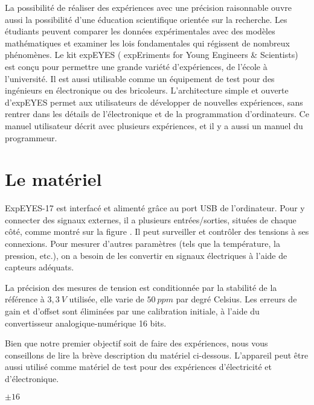 \documentclass[a4paper,12pt,french]{sphinxmanual}
\begin{document}
La possibilité de réaliser des expériences avec une précision raisonnable
ouvre aussi la possibilité d’une éducation scientifique orientée sur
la recherche. Les étudiants peuvent comparer les données expérimentales
avec des modèles mathématiques et examiner les lois fondamentales
qui régissent de nombreux phénomènes. Le kit expEYES ( expEriments
for Young Engineers \& Scientists) est conçu pour permettre une grande
variété d’expériences, de l’école à l’université. Il est aussi utilisable
comme un équipement de test pour des ingénieurs en électronique ou
des bricoleurs. L’architecture simple et ouverte d’expEYES permet
aux utilisateurs de développer de nouvelles expériences, sans rentrer
dans les détails de l’électronique et de la programmation d’ordinateurs.
Ce manuel utilisateur décrit  avec plusieurs expériences,
et il y a aussi un manuel du programmeur.


\chapter{Le matériel}
\label{\detokenize{1.2:le-materiel}}\label{\detokenize{1.2::doc}}
ExpEYES-17 est interfacé et alimenté grâce au port USB de l’ordinateur.
Pour y connecter des signaux externes, il a plusieurs entrées/sorties,
situées de chaque côté, comme montré sur la figure {\hyperref[\detokenize{1.2:fig-e17}]{}}.
Il peut surveiller et contrôler des tensions à ses connexions. Pour
mesurer d’autres paramètres (tels que la température, la pression,
etc.), on a besoin de les convertir en signaux électriques à l’aide
de capteurs adéquats.

La précision des mesures de tension est conditionnée par la stabilité
de la référence à \(3,3~V\) utilisée, elle varie de \(50~ppm\) par degré
Celsius. Les erreurs de gain et d’offset sont éliminées par une calibration
initiale, à l’aide du convertisseur analogique-numérique 16 bits.

Bien que notre premier objectif soit de faire des expériences, nous
vous conseillons de lire la brève description du matériel ci-dessous.
L’appareil peut être aussi utilisé comme matériel de test pour des
expériences d’électricité et d’électronique.


\(\pm16\)
\end{document}
